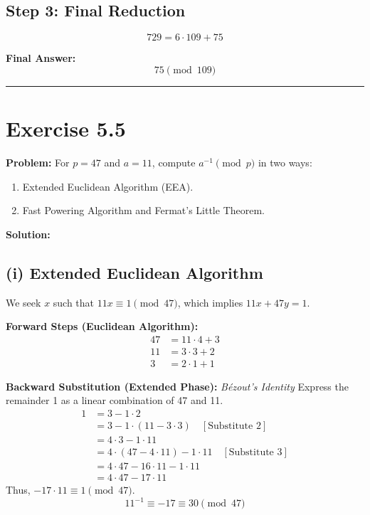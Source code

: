 \subsection*{Step 3: Final Reduction}
$$ 729 = 6 \cdot 109 + 75 $$

\textbf{Final Answer:}
$$ 75 \pmod{109} $$

\hrule
\vspace{1cm}
\newpage
\section*{Exercise 5.5}
\textbf{Problem:} For $p=47$ and $a=11$, compute $a^{-1} \pmod p$ in two ways:
\begin{enumerate}
    \item[(i)] Extended Euclidean Algorithm (EEA).
    \item[(ii)] Fast Powering Algorithm and Fermat's Little Theorem.
\end{enumerate}

\textbf{Solution:}

\subsection*{(i) Extended Euclidean Algorithm}
We seek $x$ such that $11x \equiv 1 \pmod{47}$, which implies $11x + 47y = 1$.

\textbf{Forward Steps (Euclidean Algorithm):}
\begin{align*}
    47 &= 11 \cdot 4 + 3 \\
    11 &= 3 \cdot 3 + 2 \\
    3 &= 2 \cdot 1 + 1
\end{align*}

\textbf{Backward Substitution (Extended Phase):}
\textit{Bézout's Identity}
Express the remainder 1 as a linear combination of 47 and 11.
\begin{align*}
    1 &= 3 - 1 \cdot 2 \\
      &= 3 - 1 \cdot (11 - 3 \cdot 3) \quad [\text{Substitute } 2] \\
      &= 4 \cdot 3 - 1 \cdot 11 \\
      &= 4 \cdot (47 - 4 \cdot 11) - 1 \cdot 11 \quad [\text{Substitute } 3] \\
      &= 4 \cdot 47 - 16 \cdot 11 - 1 \cdot 11 \\
      &= 4 \cdot 47 - 17 \cdot 11
\end{align*}
Thus, $-17 \cdot 11 \equiv 1 \pmod{47}$.
$$ 11^{-1} \equiv -17 \equiv 30 \pmod{47} $$

